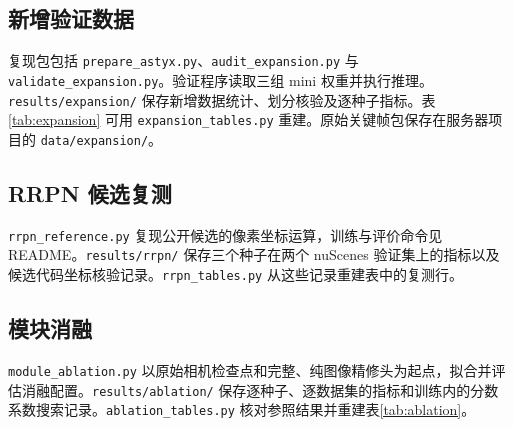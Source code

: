 \documentclass[conference,10pt,a4paper]{IEEEtran}
\begin{document}
\subsection{新增验证数据}
复现包包括 \texttt{prepare\_astyx.py}、\texttt{audit\_expansion.py} 与 \texttt{validate\_expansion.py}。验证程序读取三组 mini 权重并执行推理。\texttt{results/expansion/} 保存新增数据统计、划分核验及逐种子指标。表\ref{tab:expansion} 可用 \texttt{expansion\_tables.py} 重建。原始关键帧包保存在服务器项目的 \texttt{data/expansion/}。

\subsection{RRPN 候选复测}
\texttt{rrpn\_reference.py} 复现公开候选的像素坐标运算，训练与评价命令见 README。\texttt{results/rrpn/} 保存三个种子在两个 nuScenes 验证集上的指标以及候选代码坐标核验记录。\texttt{rrpn\_tables.py} 从这些记录重建表中的复测行。

\subsection{模块消融}
\texttt{module\_ablation.py} 以原始相机检查点和完整、纯图像精修头为起点，拟合并评估消融配置。\texttt{results/ablation/} 保存逐种子、逐数据集的指标和训练内的分数系数搜索记录。\texttt{ablation\_tables.py} 核对参照结果并重建表\ref{tab:ablation}。
\end{document}
